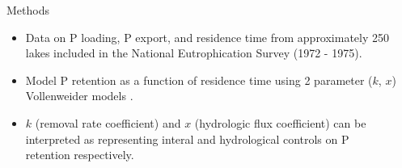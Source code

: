 \documentclass[final,hyperref={pdfpagelabels=false}]{beamer}
\begin{document}
\begin{frame}[t]
\begin{columns}[t]
\begin{column}{.03\textwidth}\end{column} %
 
\begin{column}{.465\textwidth} %

\begin{block}{Methods}

\begin{itemize}
\item Data on P loading, P export, and residence time from approximately 250 lakes included in the National Eutrophication Survey (1972 - 1975)\cite{StachelekNationalEutrophicationSurvey2017}.
\vspace{1em}
\item Model P retention as a function of residence time using 2 parameter ($k$, $x$) Vollenweider models \cite{Brettreviewreassessmentlake2007}. 
\vspace{1em}
\item $k$ (removal rate coefficient) and $x$ (hydrologic flux coefficient) can be interpreted as representing interal and hydrological controls on P retention respectively.

\end{itemize}


\end{block}


\end{column}
\end{columns}
\end{frame}
\end{document}

